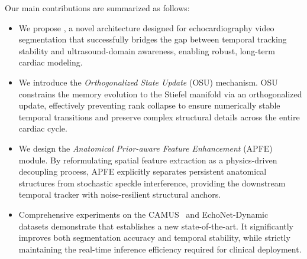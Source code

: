 Our main contributions are summarized as follows:
\begin{itemize}
    \item We propose \mymodel, a novel architecture designed for echocardiography video segmentation that successfully bridges the gap between temporal tracking stability and ultrasound-domain awareness, enabling robust, long-term cardiac modeling.
    \item We introduce the \emph{Orthogonalized State Update} (OSU) mechanism. OSU constrains the memory evolution to the Stiefel manifold via an orthogonalized update, effectively preventing rank collapse to ensure numerically stable temporal transitions and preserve complex structural details across the entire cardiac cycle.
    \item We design the \emph{Anatomical Prior-aware Feature Enhancement} (APFE) module. By reformulating spatial feature extraction as a physics-driven decoupling process, APFE explicitly separates persistent anatomical structures from stochastic speckle interference, providing the downstream temporal tracker with noise-resilient structural anchors.
    \item Comprehensive experiments on the CAMUS~\cite{tmi19_camus} and EchoNet-Dynamic~\cite{nature20_echodynamic} datasets demonstrate that \mymodel establishes a new state-of-the-art. It significantly improves both segmentation accuracy and temporal stability, while strictly maintaining the real-time inference efficiency required for clinical deployment.
\end{itemize}
